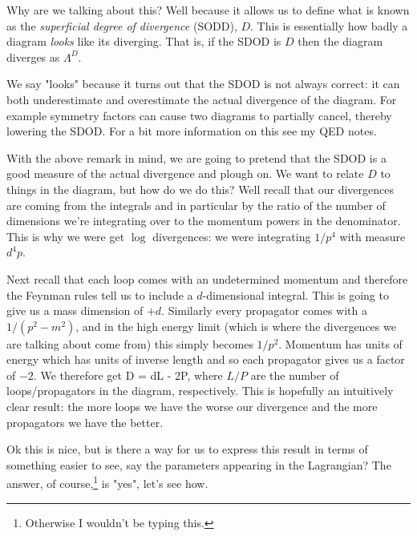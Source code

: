 Why are we talking about this? Well because it allows us to define what is known as the \textit{superficial degree of divergence} (SODD), $D$. This is essentially how badly a diagram \textit{looks} like its diverging. That is, if the SDOD is $D$ then the diagram diverges as $\Lambda^D$.

\br
\label{rem:SDOD}
    We say "looks" because it turns out that the SDOD is not always correct: it can both underestimate and overestimate the actual divergence of the diagram. For example symmetry factors can cause two diagrams to partially cancel, thereby lowering the SDOD. For a bit more information on this see my QED notes.
\er 

With the above remark in mind, we are going to pretend that the SDOD is a good measure of the actual divergence and plough on. We want to relate $D$ to things in the diagram, but how do we do this? Well recall that our divergences are coming from the integrals and in particular by the ratio of the number of dimensions we're integrating over to the momentum powers in the denominator. This is why we were get $\log$ divergences: we were integrating $1/p^4$ with measure $d^4p$. 

Next recall that each loop comes with an undetermined momentum and therefore the Feynman rules tell us to include a $d$-dimensional integral. This is going to give us a mass dimension of $+d$. Similarly every propagator comes with a $1/(p^2-m^2)$, and in the high energy limit (which is where the divergences we are talking about come from) this simply becomes $1/p^2$. Momentum has units of energy which has units of inverse length and so each propagator gives us a factor of $-2$. We therefore get 
\bse 
    D = dL - 2P,
\ese    
where $L/P$ are the number of loops/propagators in the diagram, respectively. This is hopefully an intuitively clear result: the more loops we have the worse our divergence and the more propagators we have the better. 

Ok this is nice, but is there a way for us to express this result in terms of something easier to see, say the parameters appearing in the Lagrangian? The answer, of course,\footnote{Otherwise I wouldn't be typing this.} is "yes", let's see how. 

